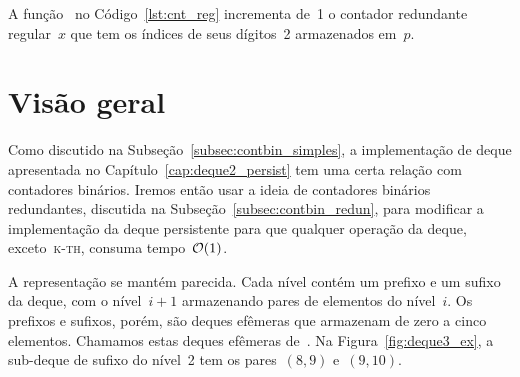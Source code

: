 \documentclass[main.tex]{subfiles}
\begin{document}
A função~ no Código~\ref{lst:cnt_reg} incrementa de~1 o contador redundante regular~$x$ que tem os índices de seus dígitos~2 armazenados em~$p$.

\section{Visão geral}

Como discutido na Subseção~\ref{subsec:contbin_simples}, a implementação de deque apresentada no Capítulo~\ref{cap:deque2_persist} tem uma certa relação com contadores binários. Iremos então usar a ideia de contadores binários redundantes, discutida na Subseção~\ref{subsec:contbin_redun}, para modificar a implementação da deque persistente para que qualquer operação da deque, exceto~\textsc{k-th}, consuma tempo~$\mathcal{O}(1)$.

A representação se mantém parecida. Cada nível contém um prefixo e um sufixo da deque, com o nível~$i+1$ armazenando pares de elementos do nível~$i$. Os prefixos e sufixos, porém, são deques efêmeras que armazenam de zero a cinco elementos. Chamamos estas deques efêmeras de~. Na Figura~\ref{fig:deque3_ex}, a sub-deque de sufixo do nível~2 tem os pares~$(8, 9)$ e~$(9, 10)$.

\end{document}
